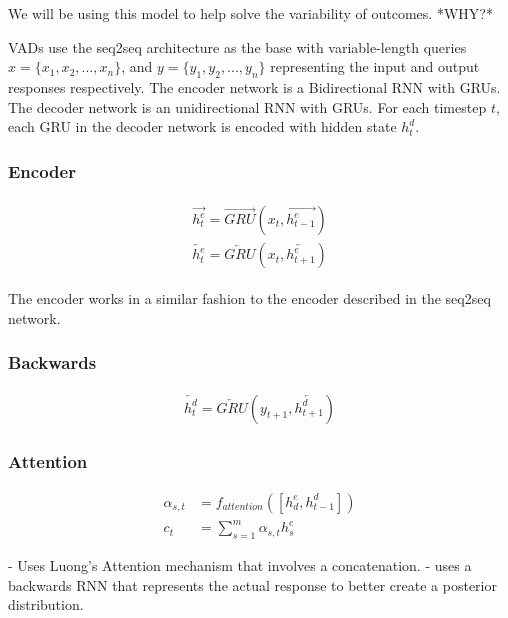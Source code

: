 \documentclass[12pt,twoside]{report}
\begin{document}
We will be using this model to help solve the variability of outcomes. *WHY?*

VADs use the seq2seq architecture as the base with variable-length queries $x = \{x_1, x_2, ..., x_n\}$, and $y = \{y_1, y_2, ..., y_n\}$ representing the input and output responses respectively. The encoder network is a Bidirectional RNN with GRUs. The decoder network is an unidirectional RNN with GRUs. For each timestep $t$, each GRU in the decoder network is encoded with hidden state $h^d_t$.

\subsubsection{Encoder}

\begin{align}
\label{eqn:eqlabel}
\begin{split}
	\overrightarrow{h^e_t} = \overrightarrow{GRU}(x_t, \overrightarrow{h^e_{t-1}})
\\
\overleftarrow{h^e_t} = \overleftarrow{GRU}(x_t, \overleftarrow{h^e_{t+1}})
\end{split}
\end{align}

The encoder works in a similar fashion to the encoder described in the seq2seq network. 

\subsubsection{Backwards}

\begin{align}
\label{eqn:eqback}
\overleftarrow{h^d_t} = \overleftarrow{GRU}(y_{t+1}, \overleftarrow{h^d_{t+1}})
\end{align}
	
\subsubsection{Attention}

\begin{equation}
\label{eq:attn}
\begin{aligned}
	\alpha_{s,t} &= f_{attention}([h^e_d, h^d_{t-1}])\\        
	c_t &= \sum^m_{s=1}\alpha_{s,t} h^e_s
\end{aligned}
\end{equation}

- Uses Luong's Attention mechanism that involves a concatenation.
- uses a backwards RNN that represents the actual response to better create a posterior distribution.
\end{document}
